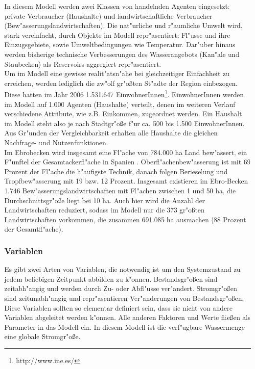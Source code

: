 \documentclass[11pt,a4paper]{article}
\begin{document}
In diesem Modell werden zwei Klassen von handelnden Agenten eingesetzt: private Verbraucher (Haushalte) und landwirtschaftliche Verbraucher (Bew"asserungslandwirtschaften). Die nat"urliche und r"aumliche Umwelt wird, stark vereinfacht, durch Objekte im Modell repr"asentiert: Fl"usse und ihre Einzugsgebiete, sowie Umweltbedingungen wie Temperatur. Dar"uber hinaus werden bisherige technische Verbesserungen des Wasserangebots (Kan"ale und Staubecken) als Reservoirs aggregiert repr"asentiert.\\
Um im Modell eine gewisse realit"atsn"ahe bei gleichzeitiger Einfachheit zu erreichen, werden lediglich die zw"olf gr"oßten St"adte der Region einbezogen.  Diese hatten im Jahr 2006 1.531.647 EinwohnerInnen\footnote{http://www.ine.es/}. EinwohnerInnen werden im Modell auf 1.000 Agenten (Haushalte) verteilt, denen im weiteren Verlauf verschiedene Attribute, wie z.B. Einkommen, zugeordnet werden. Ein Haushalt im Modell steht also je nach Stadtgr"oße f"ur ca. 500 bis 1.500 EinwohnerInnen. Aus Gr"unden der Vergleichbarkeit erhalten alle Haushalte die gleichen Nachfrage- und Nutzenfunktionen.\\

Im Ebrobecken wird insgesamt eine Fl"ache von 784.000 ha Land be\-w"as\-sert, ein F"unftel der Gesamtackerfl"ache in Spanien \citep{Salvador2011}. Oberfl"achenbew"asserung ist mit 69 Prozent der Fl"ache die h"aufigste Technik, danach folgen Berieselung und Tropfbew"asserung mit 19 bzw. 12 Prozent. Insgesamt existieren im Ebro-Becken 1.746 Bew"asserungslandwirtschaften mit Fl"achen zwischen 1 und 50 ha, die Durchschnittsgr"oße liegt bei 10 ha. Auch hier wird die Anzahl der Landwirtschaften reduziert, sodass im Modell nur die 373 gr"oßten Landwirtschaften vorkommen, die zusammen 691.085 ha ausmachen (88 Prozent der Gesamtfl"ache).

\subsubsection{Variablen}\label{sec:Variablen}
Es gibt zwei Arten von Variablen, die notwendig ist um den Systemzustand zu jedem beliebigen Zeitpunkt abbilden zu k"onnen. Bestandsgr"oßen sind zeitabh"angig und werden durch Zu- oder Abfl"usse ver"andert. Stromgr"oßen sind zeitunabh"angig und repr"asentieren Ver"anderungen von Bestandsgr"oßen. Diese Variablen sollten so elementar definiert sein, dass sie nicht von andere Variablen abgeleitet werden k"onnen. Alle anderen Faktoren und Werte fließen als Parameter in das Modell ein. In diesem Modell ist die verf"ugbare Wassermenge eine globale Stromgr"oße. \\
\end{document}
